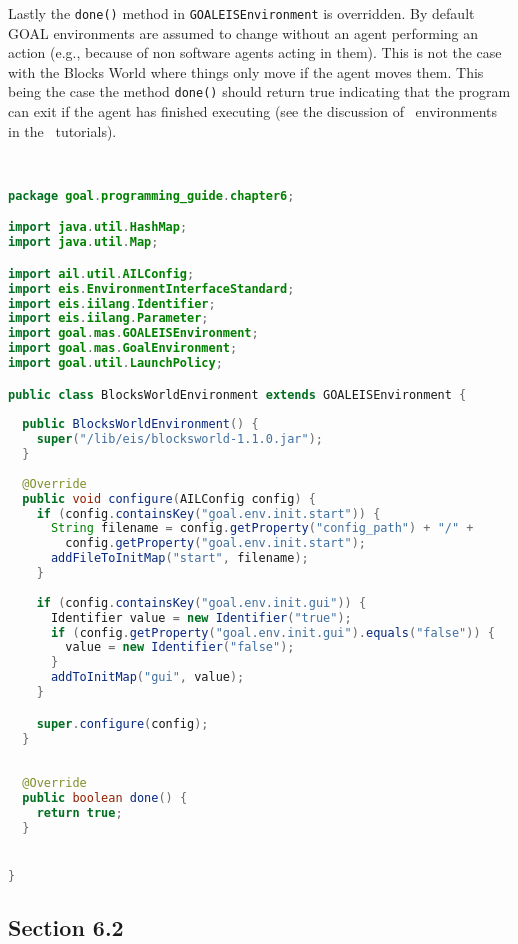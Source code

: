 \documentclass[a4]{article}
\begin{document}
Lastly the \texttt{done()} method in \texttt{GOALEISEnvironment} is overridden.  By default GOAL environments are assumed to change without an agent performing an action (e.g., because of non software agents acting in them).  This is not the case with the Blocks World where things only move if the agent moves them.  This being the case the method \texttt{done()} should return true indicating that the program can exit if the agent has finished executing (see the discussion of \ail\ environments in the \ail\ tutorials).

\begin{ourexample}
\label{code:blocksworld} \quad \\
\begin{lstlisting}[basicstyle=\sffamily,language=Java,style=easslisting]
package goal.programming_guide.chapter6;

import java.util.HashMap;
import java.util.Map;

import ail.util.AILConfig;
import eis.EnvironmentInterfaceStandard;
import eis.iilang.Identifier;
import eis.iilang.Parameter;
import goal.mas.GOALEISEnvironment;
import goal.mas.GoalEnvironment;
import goal.util.LaunchPolicy;

public class BlocksWorldEnvironment extends GOALEISEnvironment {
	
  public BlocksWorldEnvironment() {
    super("/lib/eis/blocksworld-1.1.0.jar");		
  }
	
  @Override
  public void configure(AILConfig config) {
    if (config.containsKey("goal.env.init.start")) {
      String filename = config.getProperty("config_path") + "/" +
        config.getProperty("goal.env.init.start");
      addFileToInitMap("start", filename);
    }
		
    if (config.containsKey("goal.env.init.gui")) {
      Identifier value = new Identifier("true");
      if (config.getProperty("goal.env.init.gui").equals("false")) {
        value = new Identifier("false");
      }
      addToInitMap("gui", value);
    }

    super.configure(config);
  }
	
	
  @Override
  public boolean done() {
    return true;
  }


}
\end{lstlisting}
\end{ourexample}

\subsection{Section 6.2}
\label{sec:6.2}
\end{document}
